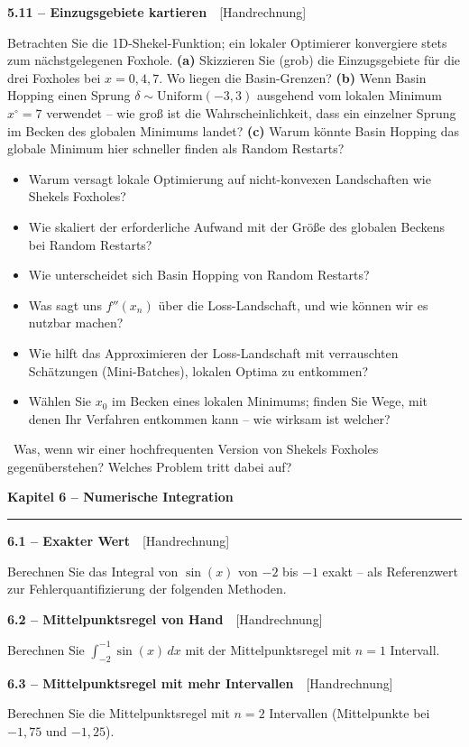 \documentclass[a4paper,10pt]{article}
\newcommand{\kapitel}[1]{%
  \par\vspace{7pt}
  {\large\bfseries\color{accent} #1}\par
  \noindent\textcolor{accent}{\rule{\linewidth}{0.8pt}}\par\vspace{2pt}}
\newcommand{\aufg}[2]{%
  \par\vspace{3pt}
  {\bfseries\color{accent2} #1}~~{\footnotesize\color{accent2}[#2]}\par\vspace{1pt}}
\newcommand{\teaser}[1]{%
  \par\vspace{2pt}{\color{accent4}\textbf{Denkanstoß.}}~#1\par}
\newcommand{\marg}[1]{\par\vspace{1pt}{\footnotesize\itshape Randnotiz: #1}\par}
\newcommand{\reflexion}{%
  \par\vspace{2pt}{\bfseries\color{accent3} Selbstreflexionsfragen}\par\vspace{1pt}}
\begin{document}
\aufg{5.11 \;--\; Einzugsgebiete kartieren}{Handrechnung}
Betrachten Sie die 1D-Shekel-Funktion; ein lokaler Optimierer konvergiere stets zum
nächstgelegenen Foxhole.
\textbf{(a)} Skizzieren Sie (grob) die Einzugsgebiete für die drei Foxholes bei
$x=0,4,7$. Wo liegen die Basin-Grenzen?
\textbf{(b)} Wenn Basin Hopping einen Sprung $\delta\sim\mathrm{Uniform}(-3,3)$
ausgehend vom lokalen Minimum $x^{\circ}=7$ verwendet -- wie groß ist die
Wahrscheinlichkeit, dass ein einzelner Sprung im Becken des globalen Minimums landet?
\textbf{(c)} Warum könnte Basin Hopping das globale Minimum hier schneller finden als
Random Restarts?

\reflexion
\begin{itemize}
  \item Warum versagt lokale Optimierung auf nicht-konvexen Landschaften wie Shekels
        Foxholes?
  \item Wie skaliert der erforderliche Aufwand mit der Größe des globalen Beckens bei
        Random Restarts?
  \item Wie unterscheidet sich Basin Hopping von Random Restarts?
  \item Was sagt uns $f''(x_n)$ über die Loss-Landschaft, und wie können wir es
        nutzbar machen?
  \item Wie hilft das Approximieren der Loss-Landschaft mit verrauschten Schätzungen
        (Mini-Batches), lokalen Optima zu entkommen?
  \item Wählen Sie $x_0$ im Becken eines lokalen Minimums; finden Sie Wege, mit denen
        Ihr Verfahren entkommen kann -- wie wirksam ist welcher?
\end{itemize}

\teaser{Was, wenn wir einer hochfrequenten Version von Shekels Foxholes
gegenüberstehen? Welches Problem tritt dabei auf?}

\kapitel{Kapitel 6 \;--\; Numerische Integration}

\aufg{6.1 \;--\; Exakter Wert}{Handrechnung}
Berechnen Sie das Integral von $\sin(x)$ von $-2$ bis $-1$ exakt -- als Referenzwert
zur Fehlerquantifizierung der folgenden Methoden.

\aufg{6.2 \;--\; Mittelpunktsregel von Hand}{Handrechnung}
Berechnen Sie $\int_{-2}^{-1}\sin(x)\,dx$ mit der Mittelpunktsregel mit $n=1$
Intervall.

\aufg{6.3 \;--\; Mittelpunktsregel mit mehr Intervallen}{Handrechnung}
Berechnen Sie die Mittelpunktsregel mit $n=2$ Intervallen (Mittelpunkte bei $-1{,}75$
und $-1{,}25$).
\marg{Berechnen Sie die Approximation auch an den Endpunkten des Intervalls und
vergleichen Sie den Fehler.}
\end{document}
